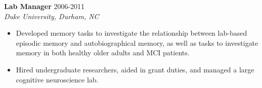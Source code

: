 \documentclass[line,margin,10pt]{res}
\begin{document}
\begin{resume}
\textbf{Lab Manager } \hfill 2006-2011 \\
\emph{Duke University, Durham, NC}\\
\begin{itemize} \itemsep -2pt
\item Developed memory tasks to investigate the relationship between lab-based episodic memory and autobiographical memory, as well as tasks to investigate memory in both healthy older adults and MCI patients.
\item Hired undergraduate researchers, aided in grant duties, and managed a large cognitive neuroscience lab.
\end{itemize}


%

\end{resume}
\end{document}

